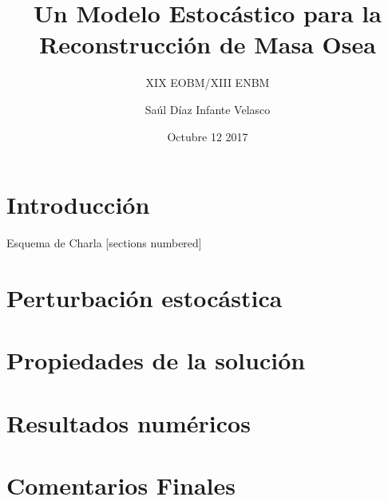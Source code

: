 \documentclass[10pt]{beamer}
\title{Un Modelo Estocástico para la Reconstrucción de Masa Osea}
\subtitle{XIX EOBM/XIII ENBM}
\date{Octubre 12 2017}
\author{Saúl Díaz Infante Velasco}
\institute{CONACYT-Universidad de Sonora}
\begin{document}
	\maketitle
 	\section*{Introducción}
		
		
		
		
		
	\begin{frame}{Esquema de Charla}
   		[sections numbered]
   		\tableofcontents[hideallsubsections]
 	\end{frame}
 	\section{Perturbación estocástica}
		
		
		
 	\section{Propiedades de la solución}
		
 	\section{Resultados numéricos}
		
 	\section{Comentarios Finales}
		
\end{document}
